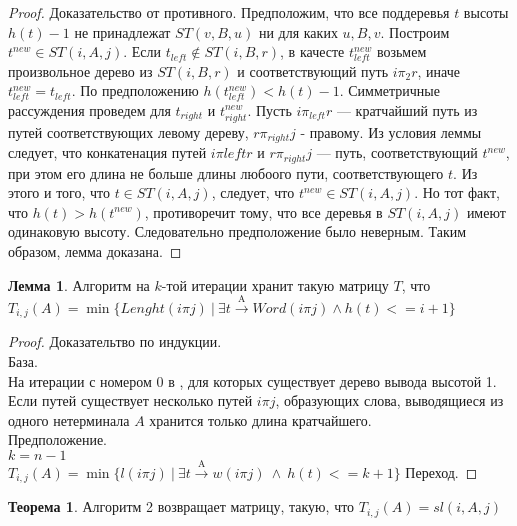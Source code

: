 \documentclass[14pt]{matmex-diploma}
\theoremstyle{definition}
\newtheorem{theorem}{Теорема}
\newtheorem{lemma}{Лемма}
\newcommand{\overtext}[2]{\ensuremath{\stackrel{\mathrm{#1}}{\mathrm{#2}}}}
\begin{document}
        \begin{proof}
                Доказательство от противного.
                Предположим, что все поддеревья $t$ высоты $h(t)-1$ не принадлежат $ST(v,B,u)$ ни для каких $u,B,v$.
                Построим $t^{new} \in ST(i,A,j)$.
                Если $t_{left} \notin ST(i,B,r)$, в качесте $t^{new}_{left}$ возьмем произвольное дерево из $ST(i,B,r)$ и соответствующий путь $i\pi_2 r$, иначе $t^{new}_{left} = t_{left}$.
                По предположению $h(t^{new}_{left}) < h(t)-1$. Симметричные рассуждения проведем для $t_{right}$ и $t^{new}_{right}$.
                Пусть $i\pi_{left} r$ --- кратчайший путь из путей соответствующих левому дереву, $r\pi_{right}j$ - правому.
                Из условия леммы следует, что конкатенация путей $i\pi{left}r$ и $r\pi_{right}j$ --- путь, соответствующий $t^{new}$, при этом его длина не больше длины любоого пути, соответствующего $t$.
                Из этого и того,  что $t \in ST(i,A,j)$, следует, что $t^{new} \in ST(i,A,j)$. Но тот факт, что $h(t) > h(t^{new})$, противоречит тому, что все деревья в $ST(i,A,j)$ имеют одинаковую высоту. Следовательно предположение было неверным.
                Таким образом, лемма доказана.
        \end{proof}
        \begin{lemma}
            Алгоритм на $k$-той итерации хранит такую матрицу $T$, что $T_{i,j}(A) = \min\{Lenght(i\pi j)~|~\exists t \overtext{A}{\rightarrow} Word(i\pi j) \land h(t) <= i+1\}$
        \end{lemma}
        \begin{proof}
        Доказательтво по индукции.\\
        База.\\
        На итерации с номером 0 в , для которых существует дерево вывода высотой 1. Если путей существует несколько путей $i\pi j$, образующих слова, выводящиеся из одного нетерминала $A$ хранится только длина кратчайшего.\\
        Предположение.\\
            $k = n-1$\\
            $T_{i,j}(A) = \min\{l(i\pi j)~|~\exists t \overtext{A}{\rightarrow} w(i\pi j)~\land~h(t) <= k+1\}$
        Переход.
             
        \end{proof}
        \begin{theorem}
            Алгоритм 2 возвращает матрицу, такую, что $T_{i,j}(A) = sl(i,A,j)$
        \end{theorem}   
            
\end{document}

